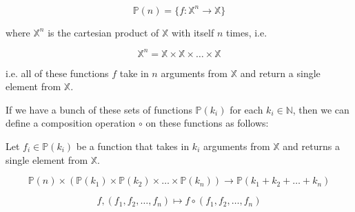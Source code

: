 \begin{equation}
  \mathbb{P}(n) = \{f: \mathbb{X}^n \to \mathbb{X}\}
\end{equation}

where $\mathbb{X}^n$ is the cartesian product of $\mathbb{X}$ with itself $n$ times, i.e.

\begin{equation}
  \mathbb{X}^n = \mathbb{X} \times \mathbb{X} \times \ldots \times \mathbb{X}
\end{equation}

i.e. all of these functions $f$ take in $n$ arguments from $\mathbb{X}$ and return a single element from $\mathbb{X}$.

\begin{figure}[h]
\centering
\end{figure}

If we have a bunch of these sets of functions $\mathbb{P}(k_i)$ for each $k_i \in \mathbb{N}$, then we can define a composition operation $\circ$ on these functions as follows:

Let $f_i \in \mathbb{P}(k_i)$ be a function that takes in $k_i$ arguments from $\mathbb{X}$ and returns a single element from $\mathbb{X}$.

\begin{equation}
    \mathbb{P}(n) \times ( \mathbb{P}(k_1) \times \mathbb{P}(k_2) \times \ldots \times \mathbb{P}(k_n) ) \to \mathbb{P}(k_1 + k_2 + \ldots + k_n)
\end{equation}

\begin{equation}
    f, (f_1, f_2, \ldots, f_n) \mapsto f \circ (f_1, f_2, \ldots, f_n)
\end{equation}


